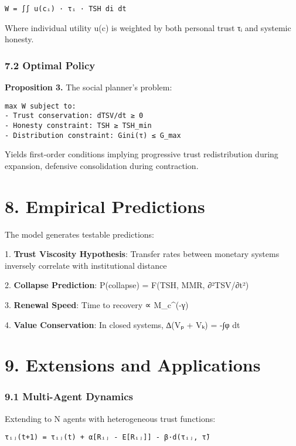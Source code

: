 \documentclass[11pt,oneside]{book}
\begin{document}
{{{{{{\begin{verbatim}
W = ∫∫ u(cᵢ) · τᵢ · TSH di dt
\end{verbatim}

Where individual utility u(c) is weighted by both personal trust τᵢ and systemic honesty.

\subsubsection{7.2 Optimal Policy}

\textbf{Proposition 3.} The social planner's problem:

\begin{verbatim}
max W subject to:
- Trust conservation: dTSV/dt ≥ 0
- Honesty constraint: TSH ≥ TSH_min  
- Distribution constraint: Gini(τ) ≤ G_max
\end{verbatim}

Yields first-order conditions implying progressive trust redistribution during expansion, defensive consolidation during contraction.

\section{8. Empirical Predictions}

The model generates testable predictions:


1. \textbf{Trust Viscosity Hypothesis}: Transfer rates between monetary systems inversely correlate with institutional distance


2. \textbf{Collapse Prediction}: P(collapse) = F(TSH, MMR, ∂²TSV/∂t²)


3. \textbf{Renewal Speed}: Time to recovery ∝ M_c^(-γ)


4. \textbf{Value Conservation}: In closed systems, ∆(Vₚ + Vₖ) = -∫φ dt


\section{9. Extensions and Applications}

\subsubsection{9.1 Multi-Agent Dynamics}

Extending to N agents with heterogeneous trust functions:

\begin{verbatim}
τᵢⱼ(t+1) = τᵢⱼ(t) + α[Rᵢⱼ - E[Rᵢⱼ]] - β·d(τᵢⱼ, τ̄)
\end{verbatim}

}}}}}}
\end{document}
